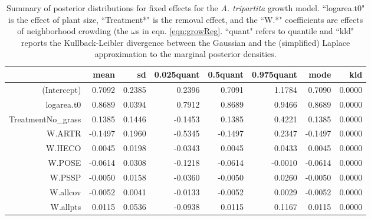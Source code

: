 \documentclass[11pt]{article}
\begin{document}
\begin{table}[ht]
\centering
\caption{Summary of posterior distributions for fixed effects for the \textit{A. tripartita} growth model. ``logarea.t0" is the effect of plant size, ``Treatment*" is the removal effect, and the ``W.*" coefficients are effects of neighborhood crowding (the $\omega$s in eqn. \ref{eqn:growReg}. ``quant" refers to quantile and ``kld" reports the Kullback-Leibler divergence between the Gaussian and the (simplified) Laplace approximation to the marginal posterior densities.} 
\label{ARTRgrowth}
\begin{tabular}{rrrrrrrr}
  \hline
 & mean & sd & 0.025quant & 0.5quant & 0.975quant & mode & kld \\ 
  \hline
(Intercept) & 0.7092 & 0.2385 & 0.2396 & 0.7091 & 1.1784 & 0.7090 & 0.0000 \\ 
  logarea.t0 & 0.8689 & 0.0394 & 0.7912 & 0.8689 & 0.9466 & 0.8689 & 0.0000 \\ 
  TreatmentNo\_grass & 0.1385 & 0.1446 & -0.1453 & 0.1385 & 0.4221 & 0.1385 & 0.0000 \\ 
  W.ARTR & -0.1497 & 0.1960 & -0.5345 & -0.1497 & 0.2347 & -0.1497 & 0.0000 \\ 
  W.HECO & 0.0045 & 0.0198 & -0.0343 & 0.0045 & 0.0433 & 0.0045 & 0.0000 \\ 
  W.POSE & -0.0614 & 0.0308 & -0.1218 & -0.0614 & -0.0010 & -0.0614 & 0.0000 \\ 
  W.PSSP & -0.0050 & 0.0158 & -0.0360 & -0.0050 & 0.0260 & -0.0050 & 0.0000 \\ 
  W.allcov & -0.0052 & 0.0041 & -0.0133 & -0.0052 & 0.0029 & -0.0052 & 0.0000 \\ 
  W.allpts & 0.0115 & 0.0536 & -0.0938 & 0.0115 & 0.1167 & 0.0115 & 0.0000 \\ 
   \hline
\end{tabular}
\end{table}
\end{document}

